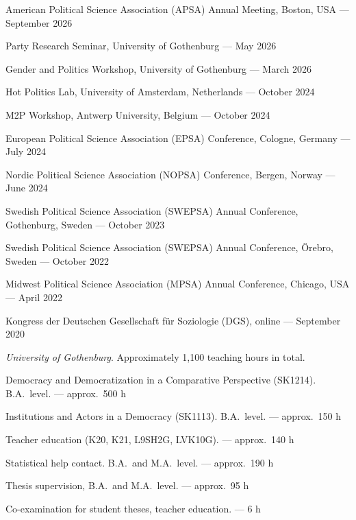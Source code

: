 \documentclass[11pt]{article}
\begin{document}
\begin{cvlist}
  \item American Political Science Association (APSA) Annual Meeting, Boston, USA --- September 2026
  \item Party Research Seminar, University of Gothenburg --- May 2026
  \item Gender and Politics Workshop, University of Gothenburg --- March 2026
  \item Hot Politics Lab, University of Amsterdam, Netherlands --- October 2024
  \item M2P Workshop, Antwerp University, Belgium --- October 2024
  \item European Political Science Association (EPSA) Conference, Cologne, Germany --- July 2024
  \item Nordic Political Science Association (NOPSA) Conference, Bergen, Norway --- June 2024
  \item Swedish Political Science Association (SWEPSA) Annual Conference, Gothenburg, Sweden --- October 2023
  \item Swedish Political Science Association (SWEPSA) Annual Conference, \"Orebro, Sweden --- October 2022
  \item Midwest Political Science Association (MPSA) Annual Conference, Chicago, USA --- April 2022
  \item Kongress der Deutschen Gesellschaft f\"ur Soziologie (DGS), online --- September 2020
\end{cvlist}

\textit{University of Gothenburg}. Approximately 1,100 teaching hours in total.
\begin{cvlist}
  \item Democracy and Democratization in a Comparative Perspective (SK1214). B.A.\ level. --- approx.\ 500 h
  \item Institutions and Actors in a Democracy (SK1113). B.A.\ level. --- approx.\ 150 h
  \item Teacher education (K20, K21, L9SH2G, LVK10G). --- approx.\ 140 h
  \item Statistical help contact. B.A.\ and M.A.\ level. --- approx.\ 190 h
  \item Thesis supervision, B.A.\ and M.A.\ level. --- approx.\ 95 h
  \item Co-examination for student theses, teacher education. --- 6 h
\end{cvlist}
\end{document}
